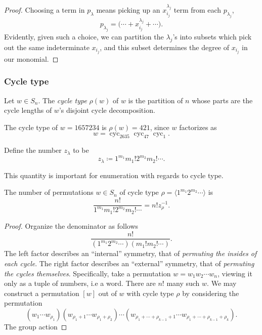 \documentclass{article}
\DeclareMathOperator{\cyc}{cyc}
\begin{document}
\begin{proof}
    Choosing a term in $p_\lambda$ means picking up an $x_{i_j}^{\lambda_j}$ term from each $p_{\lambda_j}$,
    \[
        p_{\lambda_j} = \Big(\cdots + x_{i_j}^{\lambda_j} + \cdots\Big).
    \]
    Evidently, given such a choice, we can partition the $\lambda_j$'s into subsets which pick out the same indeterminate $x_{i_j}$, and this subset determines the degree of $x_{i_j}$ in our monomial.
\end{proof}

\subsubsection{Cycle type}

\begin{definition}
    Let $w \in S_n$. The \textit{cycle type} $\rho(w)$ of $w$ is the partition of $n$ whose parts are the cycle lengths of $w$'s disjoint cycle decomposition.
\end{definition}

\begin{example}
    The cycle type of $w = 1657234$ is $\rho(w) = 421$, since $w$ factorizes as
    \[
        w = \cyc_{2635}\cyc_{47}\cyc_{1}.
    \]
\end{example}

\begin{definition}
    Define the number $z_\lambda$ to be
    \[
        z_\lambda \coloneq 1^{m_1}m_1!2^{m_2}m_2!\cdots.
    \]
\end{definition}

This quantity is important for enumeration with regards to cycle type.

\begin{theorem}
    The number of permutations $w \in S_n$ of cycle type $\rho = \langle 1^{m_1}2^{m_2}\cdots\rangle$ is
    \[
        \frac{n!}{1^{m_1}m_1!2^{m_2}m_2!\cdots} = n!z_\rho^{-1}.
    \]
\end{theorem}

\begin{proof}
    Organize the denominator as follows
    \[
        \frac{n!}{(1^{m_1}2^{m_2}\cdots)(m_1!m_2!\cdots)}.
    \]
    The left factor describes an ``internal'' symmetry, that of \textit{permuting the insides of each cycle}. 
    The right factor describes an ``external'' symmetry, that of \textit{permuting the cycles themselves}.
    Specifically, take a permutation $w = w_1w_2\cdots w_n$, viewing it only as a tuple of numbers, i.e a word.
    There are $n!$ many such $w$.
    We may construct a permutation $[w]$ out of $w$ with cycle type $\rho$ by considering the permutation
    \[
        (w_1\cdots w_{\rho_1})
        (w_{\rho_1+1}\cdots w_{\rho_1+\rho_2})\cdots(w_{\rho_1+\cdots+\rho_{k-1}+1}\cdots w_{\rho_1+\cdots+\rho_{k-1}+\rho_k}).
    \]
    The group action 
\end{proof}
\end{document}
